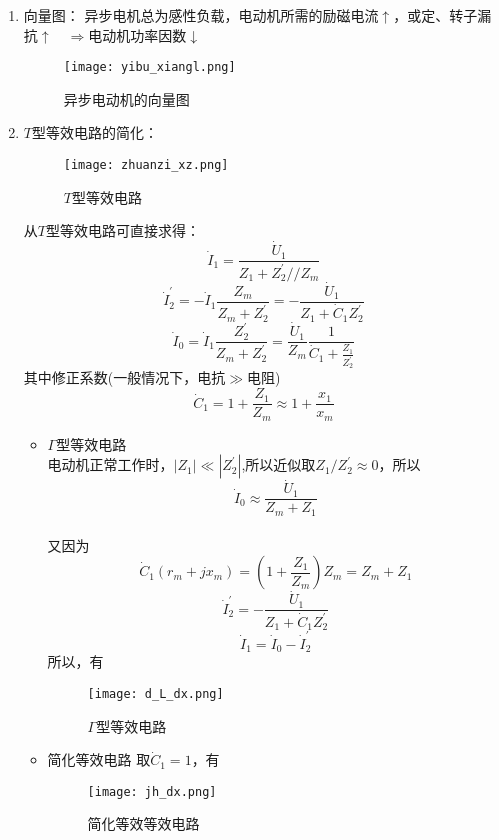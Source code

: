 \documentclass[blue]{elegantnote}
\begin{document}
\begin{enumerate}
	\newpage
	\item 向量图：
	异步电机总为{\color{main}感性负载}，电动机所需的励磁电流$\uparrow$，或定、转子漏抗$\uparrow$$\quad \Rightarrow$电动机功率因数$\downarrow$\\
	\begin{figure}[!hbtp]
		\centering
		\texttt{[image: yibu\_xiangl.png]}
		\caption{异步电动机的向量图\label{figur:yibu_xiangl}}
	\end{figure}
	
	\item $T$型等效电路的简化：
	\begin{figure}[hb]
		\centering
		\texttt{[image: zhuanzi\_xz.png]}
		\caption{$T$型等效电路\label{figur:T_dx}}
	\end{figure}
	\begin{newproof}
		从$T$型等效电路可直接求得：$$\dot I_1=\frac{\dot U_1}{Z_1+Z_2^{'}//Z_m}$$    
		$$\dot I_2^{'}=-\dot I_1\frac{Z_m}{Z_m+Z_2^{'}}=-\frac{\dot U_1}{Z_1+\dot C_1Z_2^{'}}$$  
		$$\dot I_0 = \dot I_1\frac{Z_2^{'}}{Z_m+Z_2^{'}}=\frac{\dot U_1}{Z_m}\frac{1}{\dot C_1+\frac{Z_1}{Z_2^{'}}}$$
		其中修正系数(一般情况下，{\color{blue}电抗$\gg$电阻})
		$$\dot C_1=1+\frac{Z_1}{Z_m}\approx1+\frac{x_1}{x_m}$$ 
	\end{newproof}
	
	\begin{itemize}
		\item $\Gamma$型等效电路\\
		电动机正常工作时，{\color{blue}$\left|  Z_1 \right| \ll \left| Z_2^{'}\right|$},所以近似取$Z_1/Z_2^{'}\approx 0$，所以$$\dot I_0\approx\frac{\dot U_1}{Z_m+Z_1}$$
		\\ 又因为$$\dot C_1(r_m+jx_m)=(1+\frac{Z_1}{Z_m})Z_m=Z_m+Z_1$$ $$\dot I_2^{'}=-\frac{\dot U_1}{Z_1+\dot C_1Z_2^{'}}$$  $$\dot I_1 = \dot I_0-\dot I_2^{'}$$
		所以，有
		\begin{figure}[!hbtp]
			\centering
			\texttt{[image: d\_L\_dx.png]}
			\caption{$\Gamma$型等效电路\label{figur:d_L_dx}}
		\end{figure}
		
		\item 简化等效电路
		取$\dot C_1=1$，有
		\begin{figure}[!hbtp]
			\centering
			\texttt{[image: jh\_dx.png]}
			\caption{简化等效等效电路\label{figur:jh_dx}}
		\end{figure}
	\end{itemize}
\end{enumerate}
\end{document}
